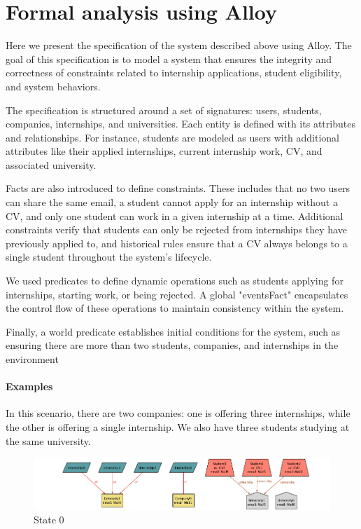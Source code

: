 \chapter{Formal analysis using Alloy}

Here we present the specification of the system described above using Alloy. The goal of this specification is to model a system that ensures the integrity and correctness of constraints related to internship applications, student eligibility, and system behaviors.

The specification is structured around a set of signatures: users, students, companies, internships, and universities. Each entity is defined with its attributes and relationships. For instance, students are modeled as users with additional attributes like their applied internships, current internship work, CV, and associated university.

Facts are also introduced to define constraints. These includes that no two users can share the same email, a student cannot apply for an internship without a CV, and only one student can work in a given internship at a time. Additional constraints verify that students can only be rejected from internships they have previously applied to, and historical rules ensure that a CV always belongs to a single student throughout the system's lifecycle.

We used predicates to define dynamic operations such as students applying for internships, starting work, or being rejected. A global "eventsFact" encapsulates the control flow of these operations to maintain consistency within the system.

Finally, a world predicate establishes initial conditions for the system, such as ensuring there are more than two students, companies, and internships in the environment

\vspace{2cm}


\subsubsection*{Examples}

In this scenario, there are two companies: one is offering three internships, while the other is offering a single internship. We also have three students studying at the same university.

\begin{figure} [H]
    \centering
    \includegraphics[width=1\linewidth]{Alloy/State.png}
    \caption{State 0}
\end{figure}

